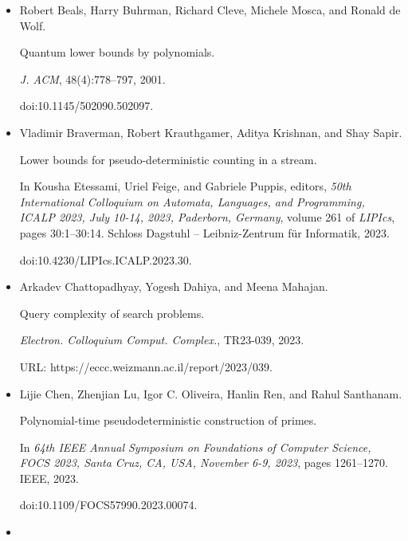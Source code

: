 \begin{itemize}
\item[] 
[5]

Robert Beals, Harry Buhrman, Richard Cleve, Michele Mosca, and Ronald de Wolf.


Quantum lower bounds by polynomials.


\emph{J. ACM}, 48(4):778–797, 2001.


doi:10.1145/502090.502097.





\item[] 
[6]

Vladimir Braverman, Robert Krauthgamer, Aditya Krishnan, and Shay Sapir.


Lower bounds for pseudo-deterministic counting in a stream.


In Kousha Etessami, Uriel Feige, and Gabriele Puppis, editors, \emph{50th International Colloquium on Automata, Languages, and Programming,
ICALP 2023, July 10-14, 2023, Paderborn, Germany}, volume 261 of \emph{LIPIcs}, pages 30:1–30:14. Schloss Dagstuhl – Leibniz-Zentrum für
Informatik, 2023.


doi:10.4230/LIPIcs.ICALP.2023.30.





\item[] 
[7]

Arkadev Chattopadhyay, Yogesh Dahiya, and Meena Mahajan.


Query complexity of search problems.


\emph{Electron. Colloquium Comput. Complex.}, TR23-039, 2023.


URL: https://eccc.weizmann.ac.il/report/2023/039.





\item[] 
[8]

Lijie Chen, Zhenjian Lu, Igor C. Oliveira, Hanlin Ren, and Rahul Santhanam.


Polynomial-time pseudodeterministic construction of primes.


In \emph{64th IEEE Annual Symposium on Foundations of Computer
Science, FOCS 2023, Santa Cruz, CA, USA, November 6-9, 2023}, pages
1261–1270. IEEE, 2023.


doi:10.1109/FOCS57990.2023.00074.





\item[] 
[9]


\end{itemize}
